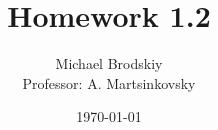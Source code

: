


\title{Homework 1.2}
\date{\today}
\author{Michael Brodskiy\\ \small Professor: A. Martsinkovsky}



\maketitle

